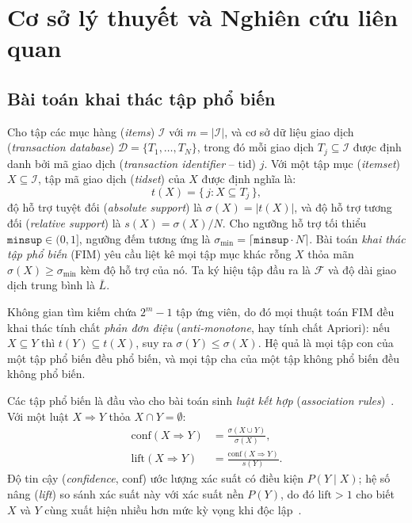 \section{Cơ sở lý thuyết và Nghiên cứu liên quan}
\label{sec:02_background}

\subsection{Bài toán khai thác tập phổ biến}
\label{subsec:fim_problem}

Cho tập các mục hàng (\emph{items}) $\mathcal{I}$ với $m = |\mathcal{I}|$, và cơ sở dữ liệu giao dịch (\emph{transaction database}) $\mathcal{D} = \{T_1, \dots, T_N\}$, trong đó mỗi giao dịch $T_j \subseteq \mathcal{I}$ được định danh bởi mã giao dịch (\emph{transaction identifier} -- tid) $j$. Với một tập mục (\emph{itemset}) $X \subseteq \mathcal{I}$, tập mã giao dịch (\emph{tidset}) của $X$ được định nghĩa là:
\begin{equation}
t(X) = \{\, j : X \subseteq T_j \,\},
\label{eq:tidset}
\end{equation}
độ hỗ trợ tuyệt đối (\emph{absolute support}) là $\sigma(X) = |t(X)|$, và độ hỗ trợ tương đối (\emph{relative support}) là $s(X) = \sigma(X)/N$. Cho ngưỡng hỗ trợ tối thiểu $\texttt{minsup} \in (0, 1]$, ngưỡng đếm tương ứng là $\sigma_{\min} = \lceil \texttt{minsup} \cdot N \rceil$. Bài toán \emph{khai thác tập phổ biến} (FIM) yêu cầu liệt kê mọi tập mục khác rỗng $X$ thỏa mãn $\sigma(X) \ge \sigma_{\min}$ kèm độ hỗ trợ của nó. Ta ký hiệu tập đầu ra là $\mathcal{F}$ và độ dài giao dịch trung bình là $\bar{L}$.

Không gian tìm kiếm chứa $2^m - 1$ tập ứng viên, do đó mọi thuật toán FIM đều khai thác tính chất \emph{phản đơn điệu} (\emph{anti-monotone}, hay tính chất Apriori): nếu $X \subseteq Y$ thì $t(Y) \subseteq t(X)$, suy ra $\sigma(Y) \le \sigma(X)$. Hệ quả là mọi tập con của một tập phổ biến đều phổ biến, và mọi tập cha của một tập không phổ biến đều không phổ biến.

Các tập phổ biến là đầu vào cho bài toán sinh \emph{luật kết hợp} (\emph{association rules})~\cite{agrawal1993mining}. Với một luật $X \Rightarrow Y$ thỏa $X \cap Y = \emptyset$:
\begin{equation}
\begin{aligned}
\mathrm{conf}(X \Rightarrow Y) &= \frac{\sigma(X \cup Y)}{\sigma(X)}, \\
\mathrm{lift}(X \Rightarrow Y) &= \frac{\mathrm{conf}(X \Rightarrow Y)}{s(Y)}.
\end{aligned}
\label{eq:rule}
\end{equation}
Độ tin cậy (\emph{confidence}, $\mathrm{conf}$) ước lượng xác suất có điều kiện $P(Y \mid X)$; hệ số nâng (\emph{lift}) so sánh xác suất này với xác suất nền $P(Y)$, do đó $\mathrm{lift} > 1$ cho biết $X$ và $Y$ cùng xuất hiện nhiều hơn mức kỳ vọng khi độc lập~\cite{brin1997dynamic}.

